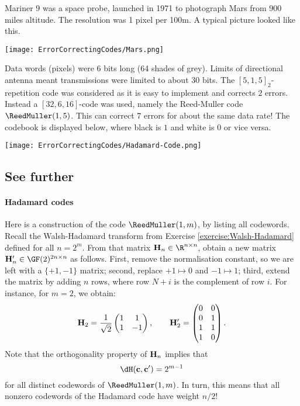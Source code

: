 \documentclass[a4paper, 11pt, openany]{book}
\begin{document}
Mariner 9 was a space probe, launched in 1971 to photograph Mars from 900 miles altitude. The resolution was 1 pixel per 100m. A typical picture looked like this.

\begin{center}
    \texttt{[image: ErrorCorrectingCodes/Mars.png]}
\end{center}

Data words (pixels) were 6 bits long (64 shades of grey).  Limits of directional antenna meant transmissions were  limited to about 30 bits. The $[5,1,5]_2$-repetition code was considered as it is easy to implement and corrects $2$ errors. Instead a $[32, 6, 16]$-code was used, namely the Reed-Muller code $\ReedMuller(1,5)$. This can correct $7$ errors for about the same data rate! The codebook is displayed below, where black is $1$ and white is $0$ or vice versa.

\begin{center}
    \texttt{[image: ErrorCorrectingCodes/Hadamard-Code.png]}
\end{center}



\subsection{See further}


\paragraph{Hadamard codes} Here is a construction of the code $\ReedMuller(1,m)$, by listing all codewords. Recall the Walsh-Hadamard transform from Exercise \ref{exercise:Walsh-Hadamard} defined for all $n = 2^m$. From that matrix ${\bf H}_n \in \R^{n \times n}$, obtain a new matrix ${\bf H}'_n \in \GF(2)^{2n \times n}$ as follows. First, remove the normalisation constant, so we are left with a $\{+1, -1\}$ matrix; second, replace $+1 \mapsto 0$ and $-1 \mapsto 1$; third, extend the matrix by adding $n$ rows, where row $N+i$ is the complement of row $i$. For instance, for $m=2$, we obtain:
\[
    {\bf H}_2 = \frac{1}{\sqrt{2}} \begin{pmatrix}
    1 & 1\\
    1 & -1
    \end{pmatrix}, \qquad
    {\bf H}'_2 = \begin{pmatrix}
    0 & 0\\
    0 & 1\\
    1 & 1\\
    1 & 0
    \end{pmatrix}.
\]
Note that the orthogonality property of ${\bf H}_n$ implies that
\[
    \dH({\bf c}, {\bf c}') = 2^{m-1}
\]
for all distinct codewords of $\ReedMuller(1,m)$. In turn, this means that all nonzero codewords of the Hadamard code have weight $n/2$!
\end{document}
